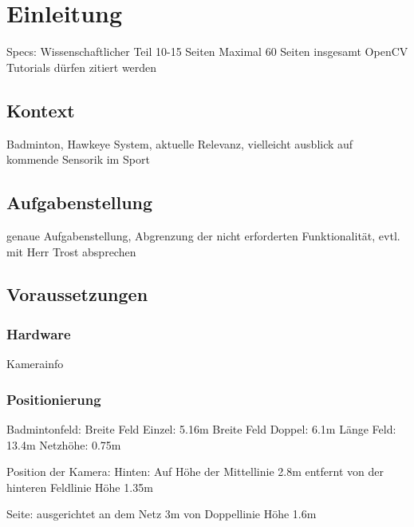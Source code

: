 \chapter{Einleitung}
Specs: 
Wissenschaftlicher Teil 10-15 Seiten
Maximal 60 Seiten insgesamt
OpenCV Tutorials dürfen zitiert werden
\section{Kontext}
Badminton, Hawkeye System, aktuelle Relevanz, vielleicht ausblick auf kommende Sensorik im Sport
\section{Aufgabenstellung}
genaue Aufgabenstellung, Abgrenzung der nicht erforderten Funktionalität, evtl. mit Herr Trost absprechen
\section{Voraussetzungen}
\subsection{Hardware}
Kamerainfo
\subsection{Positionierung}
Badmintonfeld: 
Breite Feld Einzel: 5.16m
Breite Feld Doppel: 6.1m
Länge Feld: 13.4m
Netzhöhe: 0.75m

Position der Kamera:
Hinten:
Auf Höhe der Mittellinie
2.8m entfernt von der hinteren Feldlinie
Höhe 1.35m

Seite:
ausgerichtet an dem Netz
3m von Doppellinie
Höhe 1.6m
